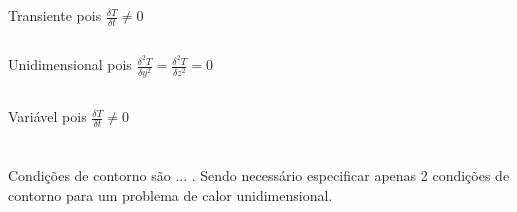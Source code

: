 \documentclass[a4paper,11pt]{article}
\title{\tituloRelatorio}
\begin{document}
\maketitle
\section{} %
\subsection{} %
\paragraph{} Transiente pois $\frac{\delta T}{\delta t} \neq 0$

\subsection{} %
\paragraph{} Unidimensional pois $\frac{\delta^2 T}{\delta y^2} = \frac{\delta^2 T}{\delta z^2} = 0$

\subsection{} %
\paragraph{} Variável pois $\frac{\delta T}{\delta t} \neq 0$

\section{} %
\paragraph{}Condições de contorno são ... . Sendo necessário especificar apenas 2 condições de contorno para um problema de calor unidimensional.

\section{} %
\end{document}

